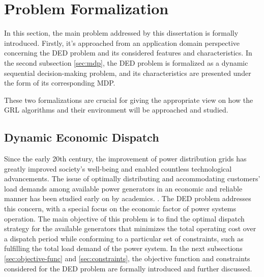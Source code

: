 \section{Problem Formalization}

In this section, the main problem addressed by this dissertation is formally introduced. Firstly, it's approached from an application domain perspective concerning the \ac{DED} problem and its considered features and characteristics. In the second subsection \ref{sec:mdp}, the \ac{DED} problem is formalized as a dynamic sequential decision-making problem, and its characteristics are presented under the form of its corresponding \ac{MDP}. \par
These two formalizations are crucial for giving the appropriate view on how the \ac{GRL} algorithms and their environment will be approached and studied.

\subsection{Dynamic Economic Dispatch}

Since the early 20th century, the improvement of power distribution grids has greatly improved society's well-being and enabled countless technological advancements. The issue of optimally distributing and accommodating customers' load demands among available power generators in an economic and reliable manner has been studied early on by academics. \cite{xiaOptimalDynamicEconomic2010}. The \acf{DED} problem addresses this concern, with a special focus on the economic factor of power systems operation. The main objective of this problem is to find the optimal dispatch strategy for the available generators that minimizes the total operating cost over a dispatch period while conforming to a particular set of constraints, such as fulfilling the total load demand of the power system. In the next subsections \ref{sec:objective-func} and \ref{sec:constraints}, the objective function and constraints considered for the \ac{DED} problem are formally introduced and further discussed.

